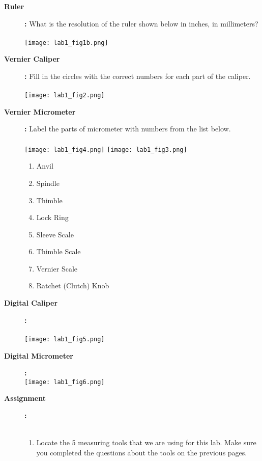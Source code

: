 \documentclass[11pt]{article}
\begin{document}
\begin{description}
        \item [\textbf{ \Large Ruler}] \textbf{ \Large :} What is the resolution of the ruler shown below in inches, in millimeters? \\\\
        \texttt{[image: lab1\_fig1b.png]}
        \item [\textbf{ \Large Vernier Caliper}] \textbf{ \Large :} Fill in the circles with the correct numbers for each part of the caliper.\\\\ 
        \texttt{[image: lab1\_fig2.png]}
        \newpage
        \item [\textbf{ \Large Vernier Micrometer}] \textbf{ \Large :} Label the parts of micrometer with numbers from the list below.\\\\ 
        \texttt{[image: lab1\_fig4.png]}
        \texttt{[image: lab1\_fig3.png]}
        \begin{multicols}{2}
        	\begin{enumerate}
 			\item Anvil
 			\item Spindle
 			\item Thimble
 			\item Lock Ring
 			\item Sleeve Scale
 			\item Thimble Scale
 			\item Vernier Scale
 			\item Ratchet (Clutch) Knob			
 		\end{enumerate}
 		\end{multicols}
        \item [\textbf{ \Large Digital Caliper}] \textbf{ \Large :}\\\\
        \texttt{[image: lab1\_fig5.png]} 
        \item [\textbf{ \Large Digital Micrometer}] \textbf{ \Large :}\\ 
        \texttt{[image: lab1\_fig6.png]}     
\newpage
	\item [\textbf{ \Large Assignment}] \textbf{ \Large :}\\\\
           
        	\begin{enumerate}
        	
 			\item Locate the 5 measuring tools that we are using for this lab. Make sure you completed the questions about the tools on the previous pages.\\
 			

\end{enumerate}
\end{description}
\end{document}
